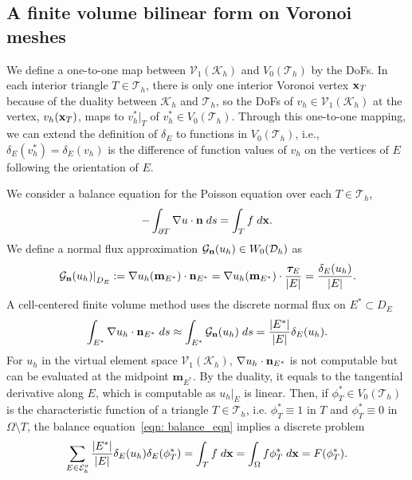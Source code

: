 \documentclass[a4paper]{article}
\theoremstyle{plain}
\theoremstyle{definition}
\numberwithin{equation}{section}
\newcommand{\bx}{{\bf x}}
\newcommand{\bn}{{\bf n}}
\newcommand{\Th}{\mathcal{T}_h}
\newcommand{\Eho}{\mathcal{E}_h^o}
\begin{document}


\subsection{A finite volume bilinear form on Voronoi meshes}\label{subsec: fvm_vespace}
We define a one-to-one map between $\mathcal{V}_1(\mathcal K_h)$ and $V_0(\Th)$ by the DoFs. In each interior triangle $T\in\Th$, there is only one interior Voronoi vertex $\bx_T$ because of the duality between $\mathcal{K}_h$ and $\Th$, so the DoFs of $v_h\in \mathcal V_1(\mathcal{K}_h)$ at the vertex, $v_h(\bx_T)$, maps to $v_h^*|_T$ of $v_h^*\in V_0(\Th)$. Through this one-to-one mapping, we can extend the definition of $\delta_E$ to functions in $V_0(\Th)$, i.e., $\delta_E(v_h^*) = \delta_E (v_h)$ is the difference of function values of $v_h$ on the vertices of $E$ following the orientation of $E$.

We consider a balance equation for the Poisson equation over each $T\in \Th$,
\begin{equation}
-\int_{\partial {T}}\nabla u\cdot \bn\;{\rm d}s=\int_{T}f\;{\rm d}\bx.\label{eqn: balance_eqn}
\end{equation}
We define a normal flux approximation $\mathcal{G}_{\bn}(u_h)\in W_0(\mathcal D_h)$ as 
\begin{equation}
\left.\mathcal{G}_{\bn}(u_h)\right|_{D_E}:=\nabla u_h(\mathbf{m}_{E^*})\cdot \bn_{E^*} =\nabla u_h(\mathbf{m}_{E^*})\cdot \frac{\bm{\tau}_{E}}{|E|} =\frac{\delta_E(u_h)}{|E|}.\label{eqn: def_discrete_grad}
\end{equation}
A cell-centered finite volume method uses the discrete normal flux on $E^*\subset D_E$
\begin{equation*}
\int_{E^*}\nabla u_h \cdot \bn_{E^*}\;{\rm d}s\approx \int_{E^*}\mathcal{G}_{\bn}(u_h)\;{\rm d}s=\frac{|E^*|}{|E|}\delta_E(u_h).
\end{equation*}
For $u_h$ in the virtual element space $\mathcal V_1(\mathcal{K}_h)$, $\nabla u_h \cdot \bn_{E^*}$ is not computable but can be evaluated at the midpoint $\mathbf{m}_{E^*}$. By the duality, it equals to the tangential derivative along $E$, which is computable as $u_h|_E$ is linear. 
Then, if $\phi_T^{*}\in V_0(\Th)$ is the characteristic function of a triangle $T\in \Th$, i.e. $\phi_T^{*}\equiv 1$ in $T$ and $\phi_T^{*}\equiv 0$ in $\Omega\setminus T$, the balance equation~\eqref{eqn: balance_eqn} implies a discrete problem
\begin{equation*}
\sum_{E\in\Eho}\frac{|E^*|}{|E|}\delta_E(u_h)\delta_E(\phi_T^{*})=\int_{T}f\;{\rm d}\bx=\int_{\Omega}f\phi_T^{*}\;{\rm d}\bx=F(\phi_T^{*}).
\end{equation*}
\end{document}
